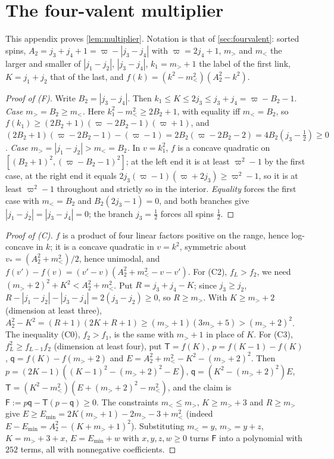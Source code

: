 \section{The four-valent multiplier}\label{app:fourvalent}

This appendix proves \cref{lem:multiplier}. Notation is that of \cref{sec:fourvalent}:
sorted spins, $A_2=j_3+j_4+1=\varpi-|j_3-j_4|$ with $\varpi=2j_4+1$, $m_>$ and $m_<$ the
larger and smaller of $|j_1-j_2|$, $|j_3-j_4|$, $k_1=m_>+1$ the label of the first
link, $K=j_1+j_2$ that of the last, and
$f(k)=(k^2-m_<^2)(A_2^2-k^2)$.

\begin{proof}[Proof of (F)]
Write $B_2=|j_3-j_4|$. Then $k_1\le K\le2j_3\le j_3+j_4=\varpi-B_2-1$.
\emph{Case $m_>=B_2\ge m_<$.} Here $k_1^2-m_<^2\ge2B_2+1$, with equality iff $m_<=B_2$,
so $f(k_1)\ge(2B_2+1)(\varpi-2B_2-1)(\varpi+1)$, and
$(2B_2+1)(\varpi-2B_2-1)-(\varpi-1)=2B_2(\varpi-2B_2-2)=4B_2(j_3-\frac12)\ge0$.
\emph{Case $m_>=|j_1-j_2|>m_<=B_2$.} In $v=k_1^2$, $f$ is a concave quadratic on
$[(B_2+1)^2,(\varpi-B_2-1)^2]$; at the left end it is at least $\varpi^2-1$ by the first case, at the
right end it equals $2j_3(\varpi-1)(\varpi+2j_3)\ge \varpi^2-1$, so it is at least $\varpi^2-1$ throughout and
strictly so in the interior.
\emph{Equality} forces the first case with $m_<=B_2$ and $B_2(2j_3-1)=0$, and both branches
give $|j_1-j_2|=|j_3-j_4|=0$; the branch $j_3=\frac12$ forces all spins $\frac12$.
\end{proof}

\begin{proof}[Proof of (C)]
$f$ is a product of four linear factors positive on the range, hence log-concave in $k$; it is
a concave quadratic in $v=k^2$, symmetric about $v_*=(A_2^2+m_<^2)/2$, hence unimodal, and
$f(v')-f(v)=(v'-v)(A_2^2+m_<^2-v-v')$.
For (C2), $f_L>f_2$, we need $(m_>+2)^2+K^2<A_2^2+m_<^2$. Put $R=j_3+j_4-K$; since $j_3\ge j_2$,
$R-|j_1-j_2|-|j_3-j_4|=2(j_3-j_2)\ge0$, so $R\ge m_>$. With $K\ge m_>+2$ (dimension at least
three), $A_2^2-K^2=(R+1)(2K+R+1)\ge(m_>+1)(3m_>+5)>(m_>+2)^2$. The inequality (C0), $f_2>f_1$, is the same
with $m_>+1$ in place of $K$.
For (C3), $f_L^2\ge f_{L-1}f_2$ (dimension at least four), put $\mathsf T=f(K)$, $p=f(K-1)-f(K)$,
$\mathsf q=f(K)-f(m_>+2)$ and $E=A_2^2+m_<^2-K^2-(m_>+2)^2$. Then $p=(2K-1)((K-1)^2-(m_>+2)^2-E)$,
$\mathsf q=(K^2-(m_>+2)^2)E$, $\mathsf T=(K^2-m_<^2)(E+(m_>+2)^2-m_<^2)$, and the claim is
$\mathsf F:=p\mathsf q-\mathsf T(p-\mathsf q)\ge0$. The constraints $m_<\le m_>$, $K\ge m_>+3$ and
$R\ge m_>$ give $E\ge E_{\min}=2K(m_>+1)-2m_>-3+m_<^2$ (indeed $E-E_{\min}=A_2^2-(K+m_>+1)^2$).
Substituting $m_<=y$, $m_>=y+z$, $K=m_>+3+x$, $E=E_{\min}+w$ with $x,y,z,w\ge0$ turns $\mathsf F$ into
a polynomial with $252$ terms, all with nonnegative coefficients.
\end{proof}

